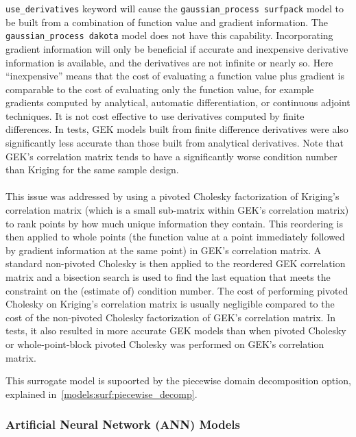 \begin{itemize}
      \texttt{use\_derivatives}  keyword will cause the 
      \texttt{gaussian\_process surfpack} model to be built from a 
      combination of function value and gradient information.  The 
      \texttt{gaussian\_process dakota} model does not have this 
      capability.  Incorporating gradient information will only be 
      beneficial if accurate and inexpensive derivative information is 
      available, and the derivatives are not infinite or nearly so.  Here 
      ``inexpensive'' means that the cost of evaluating a function value 
      plus gradient is comparable to the cost of evaluating only the 
      function value, for example gradients computed by analytical, 
      automatic differentiation, or continuous adjoint techniques. It is 
      not cost effective to use derivatives computed by finite differences.
      In tests, GEK models built from finite difference derivatives were 
      also significantly less accurate than those built from analytical 
      derivatives.  Note that GEK's correlation matrix tends to have a 
      significantly worse condition number than Kriging for the same 
      sample design.\\ \\
      This issue was addressed by using a pivoted Cholesky 
      factorization of Kriging's correlation matrix (which is a small 
      sub-matrix within GEK's correlation matrix) to rank points by how 
      much unique information they contain. This reordering is then 
      applied to whole points (the function value at a point immediately 
      followed by gradient information at the same point) in GEK's 
      correlation matrix.  A standard non-pivoted Cholesky is then 
      applied to the reordered GEK correlation matrix and a bisection 
      search is used to find the last equation that meets the constraint on 
      the (estimate of) condition number. The cost of performing pivoted
      Cholesky on Kriging's correlation matrix is usually negligible 
      compared to the cost of the non-pivoted Cholesky factorization of 
      GEK's correlation matrix.  In tests, it also resulted in more
      accurate GEK models than when pivoted Cholesky or 
      whole-point-block pivoted Cholesky was performed on GEK's 
      correlation matrix.
\end{itemize}

This surrogate model is supoorted by the piecewise domain decomposition option, explained in~\ref{models:surf:piecewise_decomp}.

\subsubsection{Artificial Neural Network (ANN) Models}\label{models:surf:ann}

